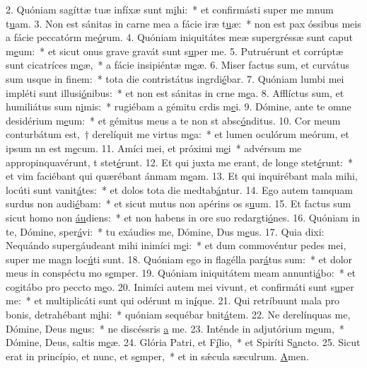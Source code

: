 2. Quóniam sagíttæ tuæ infíxæ sunt m\uline{i}hi:~* et confirmásti super me mnum t\uline{u}am.
3. Non est sánitas in carne mea a fácie iræ t\uline{u}æ:~* non est pax óssibus meis a fácie peccatórm me\uline{ó}rum.
4. Quóniam iniquitátes meæ supergréssæ sunt caput m\uline{e}um:~* et sicut onus grave gravát sunt s\uline{u}per me.
5. Putruérunt et corrúptæ sunt cicatríces m\uline{e}æ,~* a fácie insipiéntæ m\uline{e}æ.
6. Miser factus sum, et curvátus sum usque in f\uline{i}nem:~* tota die contristátus ingrdi\uline{é}bar.
7. Quóniam lumbi mei impléti sunt illusi\uline{ó}nibus:~* et non est sánitas in crne m\uline{e}a.
8. Afflíctus sum, et humiliátus sum n\uline{i}mis:~* rugiébam a gémitu crdis m\uline{e}i.
9. Dómine, ante te omne desidérium m\uline{e}um:~* et gémitus meus a te non st absc\uline{ó}nditus.
10. Cor meum conturbátum est,~† derelíquit me virtus m\uline{e}a:~* et lumen oculórum meórum, et ipsum nn est m\uline{e}cum.
11. Amíci mei, et próximi m\uline{e}i~* advérsum me appropinquavérunt, t stet\uline{é}runt.
12. Et qui juxta me erant, de longe stet\uline{é}runt:~* et vim faciébant qui quærébant ánmam m\uline{e}am.
13. Et qui inquirébant mala mihi, locúti sunt vanit\uline{á}tes:~* et dolos tota die medtab\uline{á}ntur.
14. Ego autem tamquam surdus non audi\uline{é}bam:~* et sicut mutus non apérins os s\uline{u}um.
15. Et factus sum sicut homo non \uline{áu}diens:~* et non habens in ore suo redargti\uline{ó}nes.
16. Quóniam in te, Dómine, sper\uline{á}vi:~* tu exáudies me, Dómine, Dus m\uline{e}us.
17. Quia dixi: Nequándo supergáudeant mihi inimíci m\uline{e}i:~* et dum commovéntur pedes mei, super me magn loc\uline{ú}ti sunt.
18. Quóniam ego in flagélla par\uline{á}tus sum:~* et dolor meus in conspéctu mo s\uline{e}mper.
19. Quóniam iniquitátem meam annunti\uline{á}bo:~* et cogitábo pro peccto m\uline{e}o.
20. Inimíci autem mei vivunt, et confirmáti sunt s\uline{u}per me:~* et multiplicáti sunt qui odérunt m in\uline{í}que.
21. Qui retríbuunt mala pro bonis, detrahébant m\uline{i}hi:~* quóniam sequébar bnit\uline{á}tem.
22. Ne derelínquas me, Dómine, Deus m\uline{e}us:~* ne discéssris \uline{a} me.
23. Inténde in adjutórium m\uline{e}um,~* Dómine, Deus, saltis m\uline{e}æ.
24. Glória Patri, et F\uline{í}lio,~* et Spiríti S\uline{a}ncto.
25. Sicut erat in princípio, et nunc, et s\uline{e}mper,~* et in sǽcula sæculrum. \uline{A}men.
